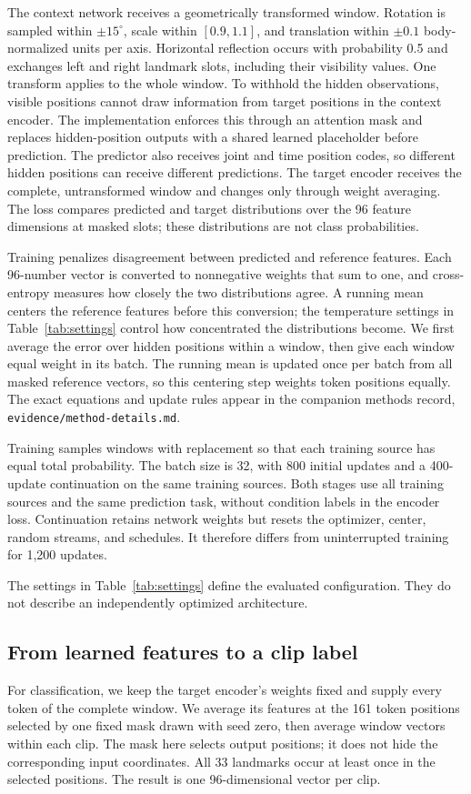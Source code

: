 \documentclass[10pt,twocolumn,letterpaper]{article}
\begin{document}
The context network receives a geometrically transformed window. Rotation is sampled within $\pm15^\circ$, scale within $[0.9,1.1]$, and translation within $\pm0.1$ body-normalized units per axis. Horizontal reflection occurs with probability 0.5 and exchanges left and right landmark slots, including their visibility values. One transform applies to the whole window. To withhold the hidden observations, visible positions cannot draw information from target positions in the context encoder. The implementation enforces this through an attention mask and replaces hidden-position outputs with a shared learned placeholder before prediction. The predictor also receives joint and time position codes, so different hidden positions can receive different predictions. The target encoder receives the complete, untransformed window and changes only through weight averaging. The loss compares predicted and target distributions over the 96 feature dimensions at masked slots; these distributions are not class probabilities.

Training penalizes disagreement between predicted and reference features. Each 96-number vector is converted to nonnegative weights that sum to one, and cross-entropy measures how closely the two distributions agree. A running mean centers the reference features before this conversion; the temperature settings in Table~\ref{tab:settings} control how concentrated the distributions become. We first average the error over hidden positions within a window, then give each window equal weight in its batch. The running mean is updated once per batch from all masked reference vectors, so this centering step weights token positions equally. The exact equations and update rules appear in the companion methods record, \texttt{evidence/method-details.md}.

Training samples windows with replacement so that each training source has equal total probability. The batch size is 32, with 800 initial updates and a 400-update continuation on the same training sources. Both stages use all training sources and the same prediction task, without condition labels in the encoder loss. Continuation retains network weights but resets the optimizer, center, random streams, and schedules. It therefore differs from uninterrupted training for 1,200 updates.

The settings in Table~\ref{tab:settings} define the evaluated configuration. They do not describe an independently optimized architecture.

\subsection{From learned features to a clip label}
For classification, we keep the target encoder's weights fixed and supply every token of the complete window. We average its features at the 161 token positions selected by one fixed mask drawn with seed zero, then average window vectors within each clip. The mask here selects output positions; it does not hide the corresponding input coordinates. All 33 landmarks occur at least once in the selected positions. The result is one 96-dimensional vector per clip.
\end{document}
